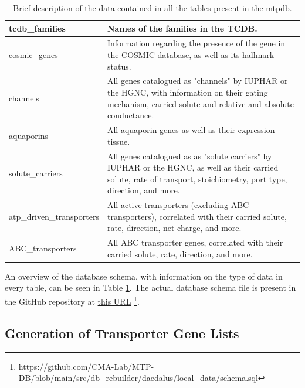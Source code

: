 \begin{table}
\begin{tabularx}{\textwidth}{|l|X|}
tcdb\_families            & Names of the families in the TCDB.                                                                                                                                  \\ \hline
cosmic\_genes             & Information regarding the presence of the gene in the COSMIC database, as well as its hallmark status.                                                              \\ \hline
channels                  & All genes catalogued as "channels" by IUPHAR or the HGNC, with information on their gating mechanism, carried solute and relative and absolute conductance.         \\ \hline
aquaporins                & All aquaporin genes as well as their expression tissue.                                                                                                             \\ \hline
solute\_carriers          & All genes catalogued as as "solute carriers" by IUPHAR or the HGNC, as well as their carried solute, rate of transport, stoichiometry, port type, direction, and more. \\ \hline
atp\_driven\_transporters & All active transporters (excluding ABC transporters), correlated with their carried solute, rate, direction, net charge, and more.                                  \\ \hline
ABC\_transporters         & All ABC transporter genes, correlated with their carried solute, rate, direction, and more.                                                                         \\ \hline
\end{tabularx}%
\caption{Brief description of the data contained in all the tables present in the \gls{mtpdb}.}
\label{tab:databaseSchema}
\end{table}

An overview of the database schema, with information on the type of data in
every table, can be seen in Table \ref{tab:databaseSchema}. The actual database
schema file is present in the GitHub repository at
\href{https://github.com/CMA-Lab/MTP-DB/blob/main/src/db_rebuilder/daedalus/local_data/schema.sql}{this URL} \footnote{https://github.com/CMA-Lab/MTP-DB/blob/main/src/db\_rebuilder/daedalus/local\_data/schema.sql}.

\subsection{Generation of Transporter Gene Lists}

